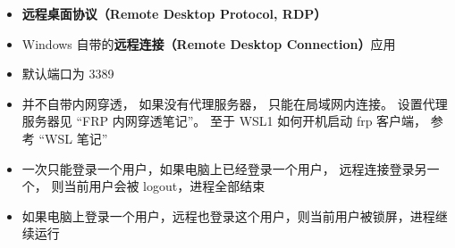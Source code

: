 
\begin{issues}
\issueDraft
\end{issues}

\begin{itemize}
\item \textbf{远程桌面协议（Remote Desktop Protocol, RDP）}
\item Windows 自带的\textbf{远程连接（Remote Desktop Connection）}应用
\item 默认端口为 3389
\item 并不自带内网穿透， 如果没有代理服务器， 只能在局域网内连接。 设置代理服务器见 “FRP 内网穿透笔记”。 至于 WSL1 如何开机启动 frp 客户端， 参考 “WSL 笔记”
\item 一次只能登录一个用户，如果电脑上已经登录一个用户， 远程连接登录另一个， 则当前用户会被 logout，进程全部结束
\item 如果电脑上登录一个用户，远程也登录这个用户，则当前用户被锁屏，进程继续运行
\end{itemize}

